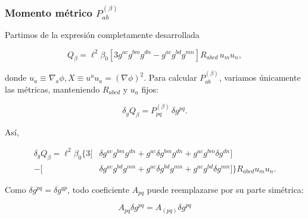 \documentclass{beamer}
\newcommand{\CompactDisplaySpacing}{%
  \setlength{\abovedisplayskip}{2pt plus 1pt minus 1pt}%
  \setlength{\belowdisplayskip}{2pt plus 1pt minus 1pt}%
  \setlength{\abovedisplayshortskip}{0pt plus 1pt}%
  \setlength{\belowdisplayshortskip}{1pt plus 1pt}%
}
\begin{document}
\begin{frame}[label=nav-frame-101]
\frametitle{Momento métrico \(P^{(\beta)}_{ab}\)}
\small
\linespread{.96}\selectfont\CompactDisplaySpacing

Partimos de la expresión completamente desarrollada

\[
Q_\beta
=
\ell^2\beta_0
\left[
3g^{ac}g^{bm}g^{dn}
-
g^{ac}g^{bd}g^{mn}
\right]
R_{abcd}\,u_m u_n,
\]

donde $u_a\equiv\nabla_a\phi, X\equiv u^a u_a=(\nabla\phi)^2$. Para calcular \(P^{(\beta)}_{ab}\), variamos únicamente las
métricas, manteniendo \(R_{abcd}\) y \(u_a\) fijos:

\[
\delta_g Q_\beta
=
P^{(\beta)}_{pq}\,\delta g^{pq}.
\]

Así,

\[
\begin{aligned}
\delta_g Q_\beta
=
\ell^2\beta_0
\Big\{
3\Big[
&\delta g^{ac}g^{bm}g^{dn}
+g^{ac}\delta g^{bm}g^{dn}
+g^{ac}g^{bm}\delta g^{dn}
\Big]
\\
-\Big[
&\delta g^{ac}g^{bd}g^{mn}
+g^{ac}\delta g^{bd}g^{mn}
+g^{ac}g^{bd}\delta g^{mn}
\Big]
\Big\}
R_{abcd}u_m u_n .
\end{aligned}
\]

Como $\delta g^{pq}=\delta g^{qp}$, todo coeficiente \(A_{pq}\) puede reemplazarse por su parte simétrica:

\[
\boxed{
A_{pq}\delta g^{pq} = A_{(pq)}\delta g^{pq}
}
\]

\end{frame}
\end{document}
